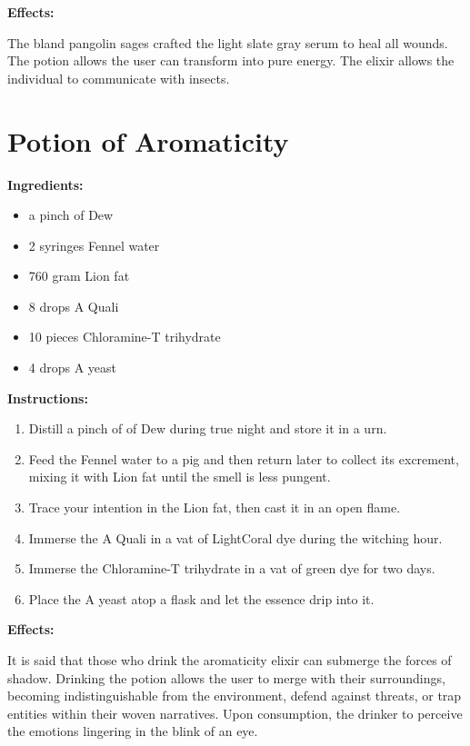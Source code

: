 \documentclass{article}
\begin{document}
\textbf{Effects:}

The bland pangolin sages crafted the light slate gray serum to heal all wounds. The potion allows the user can transform into pure energy. The elixir allows the individual to communicate with insects.

\newpage
\section*{Potion of Aromaticity}

\textbf{Ingredients:}

\begin{itemize}
  \item a pinch of Dew
  \item 2 syringes Fennel water
  \item 760 gram Lion fat
  \item 8 drops A Quali
  \item 10 pieces Chloramine-T trihydrate
  \item 4 drops A yeast
\end{itemize}

\textbf{Instructions:}

\begin{enumerate}
  \item Distill a pinch of of Dew during true night and store it in a urn.
  \item Feed the Fennel water to a pig and then return later to collect its excrement, mixing it with Lion fat until the smell is less pungent.
  \item Trace your intention in the Lion fat, then cast it in an open flame.
  \item Immerse the A Quali in a vat of LightCoral dye during the witching hour.
  \item Immerse the Chloramine-T trihydrate in a vat of green dye for two days.
  \item Place the A yeast atop a flask and let the essence drip into it.
\end{enumerate}

\textbf{Effects:}

It is said that those who drink the aromaticity elixir can submerge the forces of shadow. Drinking the potion allows the user to merge with their surroundings, becoming indistinguishable from the environment, defend against threats, or trap entities within their woven narratives. Upon consumption, the drinker to perceive the emotions lingering in the blink of an eye.
\end{document}
